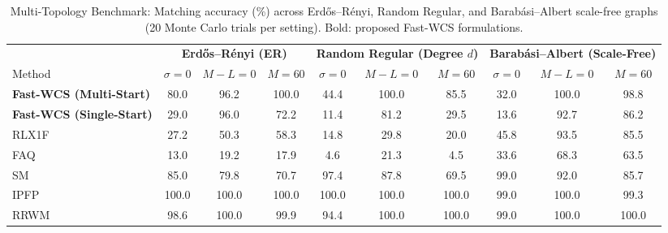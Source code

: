 \begin{table}[!t]
\centering
\caption{Multi-Topology Benchmark: Matching accuracy (\%) across Erdős–Rényi, Random Regular, and Barabási–Albert scale-free graphs (20 Monte Carlo trials per setting). Bold: proposed Fast-WCS formulations.}
\label{tab:topologies}
\fontsize{7.2}{8.8}\selectfont
\setlength{\tabcolsep}{3.5pt}
\begin{tabular*}{\textwidth}{@{\extracolsep{\fill}}lccccccccc@{}}
\toprule
 & \multicolumn{3}{c}{\textbf{Erdős–Rényi (ER)}} & \multicolumn{3}{c}{\textbf{Random Regular (Degree $d$)}} & \multicolumn{3}{c}{\textbf{Barabási–Albert (Scale-Free)}} \\
\cmidrule(lr){2-4}\cmidrule(lr){5-7}\cmidrule(l){8-10}
Method & $\sigma{=}0$ & $M{-}L{=}0$ & $M{=}60$ & $\sigma{=}0$ & $M{-}L{=}0$ & $M{=}60$ & $\sigma{=}0$ & $M{-}L{=}0$ & $M{=}60$ \\
\midrule
\textbf{Fast-WCS (Multi-Start)} & 80.0 & 96.2 & 100.0 & 44.4 & 100.0 & 85.5 & 32.0 & 100.0 & 98.8 \\
\textbf{Fast-WCS (Single-Start)} & 29.0 & 96.0 & 72.2 & 11.4 & 81.2 & 29.5 & 13.6 & 92.7 & 86.2 \\
\midrule
RLX1F~\cite{yang2018algorithm} & 27.2 & 50.3 & 58.3 & 14.8 & 29.8 & 20.0 & 45.8 & 93.5 & 85.5 \\
FAQ~\cite{vogelstein2015fast} & 13.0 & 19.2 & 17.9 & 4.6 & 21.3 & 4.5 & 33.6 & 68.3 & 63.5 \\
SM~\cite{leordeanu2005} & 85.0 & 79.8 & 70.7 & 97.4 & 87.8 & 69.5 & 99.0 & 92.0 & 85.7 \\
IPFP~\cite{leordeanu2009ipfp} & 100.0 & 100.0 & 100.0 & 100.0 & 100.0 & 100.0 & 99.0 & 100.0 & 99.3 \\
RRWM~\cite{cho2010rrwm} & 98.6 & 100.0 & 99.9 & 94.4 & 100.0 & 100.0 & 99.0 & 100.0 & 100.0 \\
\bottomrule
\end{tabular*}
\end{table}
